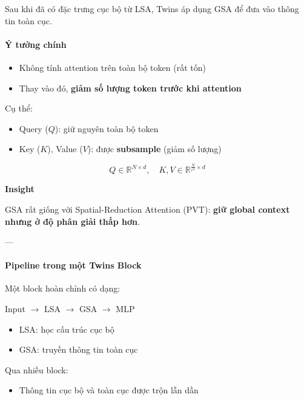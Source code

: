Sau khi đã có đặc trưng cục bộ từ LSA, Twins áp dụng GSA để đưa vào thông tin toàn cục.

\paragraph{Ý tưởng chính}

\begin{itemize}
	\item Không tính attention trên toàn bộ token (rất tốn)
	\item Thay vào đó, \textbf{giảm số lượng token trước khi attention}
\end{itemize}

Cụ thể:

\begin{itemize}
	\item Query ($Q$): giữ nguyên toàn bộ token
	\item Key ($K$), Value ($V$): được \textbf{subsample} (giảm số lượng)
\end{itemize}

\[
Q \in \mathbb{R}^{N \times d}, \quad
K, V \in \mathbb{R}^{\frac{N}{r^2} \times d}
\]

\begin{mdframed}[style=infobox]
	\textbf{Insight}
	
	GSA rất giống với Spatial-Reduction Attention (PVT):  
	\textbf{giữ global context nhưng ở độ phân giải thấp hơn}.
\end{mdframed}

---

\paragraph{Pipeline trong một Twins Block}

Một block hoàn chỉnh có dạng:

\begin{center}
	Input $\rightarrow$ LSA $\rightarrow$ GSA $\rightarrow$ MLP
\end{center}

\begin{itemize}
	\item LSA: học cấu trúc cục bộ
	\item GSA: truyền thông tin toàn cục
\end{itemize}

Qua nhiều block:
\begin{itemize}
	\item Thông tin cục bộ và toàn cục được trộn lẫn dần
\end{itemize}

